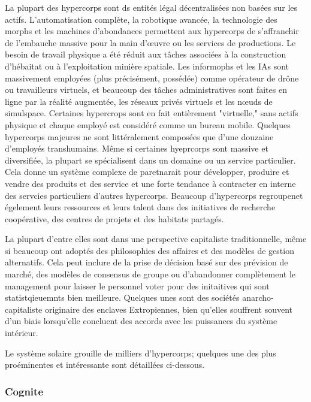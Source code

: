 La plupart des hypercorps sont ds entités légal décentralisées non basées sur les actifs. L'automatisation complète, la robotique avancée, la technologie des morphs et les machines d'abondances permettent aux hypercorps de s'affranchir de l'embauche massive pour la main d'œuvre ou les services de productions. Le besoin de travail physique a été réduit aux tâches associées à la construction d'hébaitat ou à l'exploitation minière spatiale. Les informophs et les IAs sont massivement employées (plus précisément, possédée) comme opérateur de drône ou travailleurs virtuels, et beaucoup des tâches administratives sont faites en ligne par la réalité augmentée, les réseaux privés virtuels et les nœuds de simulspace. Certaines hypercrops sont en fait entièrement "virtuelle," sans actifs physique et chaque employé est considéré comme un bureau mobile. Quelques hypercorps majeures ne sont littéralement composées que d'une douzaine d'employés transhumains. Même si certaines hyeprcorps sont massive et diversifiée, la plupart se spécialisent dans un domaine ou un service particulier. Cela donne un système complexe de paretnarait pour développer, produire et vendre des produits et des service et une forte tendance à contracter en interne des servcies particuliers d'autres hypercorps. Beaucoup d'hypercorps regroupenet égelement leurs ressources et leurs talent dans des initiatives de recherche coopérative, des centres de projets et des habitats partagés. 

La plupart d'entre elles sont dans une perspective capitaliste traditionnelle, même si beaucoup ont adoptés des philosophies des affaires et des modèles de gestion alternatifs. Cela peut inclure de la prise de décision basé sur des prévision de marché, des modèles de consensus de groupe ou d'abandonner complètement le management pour laisser le personnel voter pour des initaitives qui sont statistqieuemnts bien meilleure. Quelques unes sont des sociétés anarcho-capitaliste originaire des enclaves Extropiennes, bien qu'elles souffrent souvent d'un biais lorsqu'elle concluent des accords avec les puissances du système intérieur. 

Le système solaire grouille de milliers d'hypercorps; quelques une des plus proéminentes et intéressante sont détaillées ci-dessous. 

\subsubsection{Cognite} \label{sec:cognite} 

